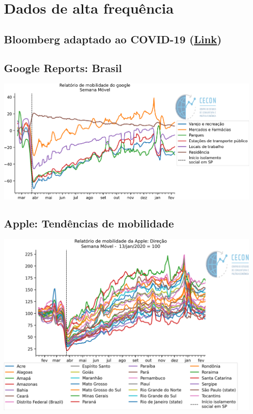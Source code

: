 \documentclass{SelfArx}
\begin{document}
\section*{Dados de alta frequência}
\label{sec:orgc7756df}

\subsection*{Bloomberg adaptado ao COVID-19 (\href{https://www.bloomberg.com/news/articles/2020-11-13/alternative-data-show-activity-crashes-as-virus-resurges-chart}{Link})}
\label{sec:org5cde0d4}

\subsection*{Google Reports: Brasil}
\label{sec:org07a2e13}

\begin{center}
\includegraphics[width=.9\linewidth]{./figs/Granulares/GoogleReport_Brasil.png}
\end{center}

\subsection*{Apple: Tendências de mobilidade}
\label{sec:orgf92855c}

\begin{center}
\includegraphics[width=.9\linewidth]{./figs/Granulares/AppleReport_Brasil.png}
\end{center}
\end{document}
